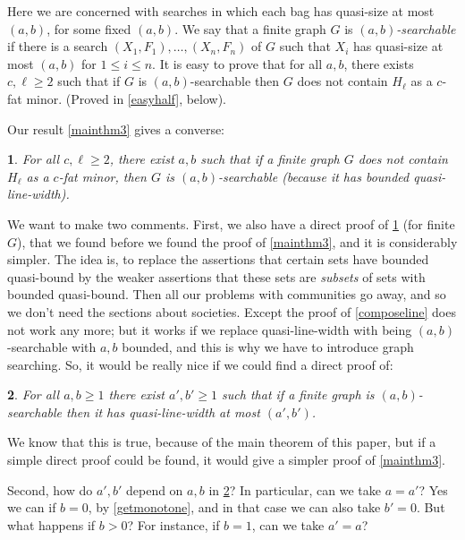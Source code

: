 \documentclass[titlepage,11pt]{article}
\def\LL{,\ldots,}
\newtheorem{thm}{}[section]
\begin{document}
	Here we are concerned with searches in which each bag has quasi-size at most $(a,b)$, for some
	fixed $(a,b)$. We say that a finite graph $G$ is {\em $(a,b)$-searchable} if there is a search $(X_1,F_1)\LL (X_n,F_n)$
	of $G$ such that $X_i$ has quasi-size at most $(a,b)$ for $1\le i\le n$.
	It is easy to prove that for all $a,b$, there exists $c,\ell\ge 2$ such that if $G$ is $(a,b)$-searchable then $G$ does not contain
	$H_{\ell}$ as a $c$-fat minor. (Proved in \ref{easyhalf}, below).
	
	Our result \ref{mainthm3} gives a converse:
	\begin{thm}\label{searching}
		For all $c,\ell\ge 2$, there exist $a,b$ such that if a finite graph $G$ does not contain
		$H_{\ell}$ as a $c$-fat minor, then $G$ is $(a,b)$-searchable (because it has bounded quasi-line-width). 
	\end{thm}
	
	We want to make two comments. First, we also have a direct proof of \ref{searching} (for finite $G$), that we found before we found the proof of 
	\ref{mainthm3}, and it is considerably simpler. The idea is, to replace the assertions that certain sets have bounded quasi-bound
	by the weaker assertions that these sets are {\em subsets} of sets with bounded quasi-bound. Then all our problems with communities go 
	away, and so we don't need the sections about societies. Except the proof of \ref{composeline} does not work any more; but it works if 
	we replace
	quasi-line-width with being $(a,b)$-searchable with $a,b$ bounded, and this is why we have to introduce graph searching. So, it would 
	be really nice if we could find a direct proof of:
	
	\begin{thm}\label{eqnce}
		For all $a,b\ge 1$ there exist $a',b'\ge 1$ such that if a finite graph is $(a,b)$-searchable then it has quasi-line-width at most $(a',b')$.
	\end{thm}
	We know that this is true, because of the main theorem of this paper, but if a simple direct proof could be found, it would give a 
	simpler proof of \ref{mainthm3}.
	
	Second, how do $a',b'$ depend on $a,b$ in \ref{eqnce}? In particular, can we take $a=a'$? Yes we can if $b=0$, by \ref{getmonotone}, 
	and in that case we can also take $b'=0$. But what happens if $b>0$? For instance, if $b=1$, can we take $a'=a$?
	
\end{document}
